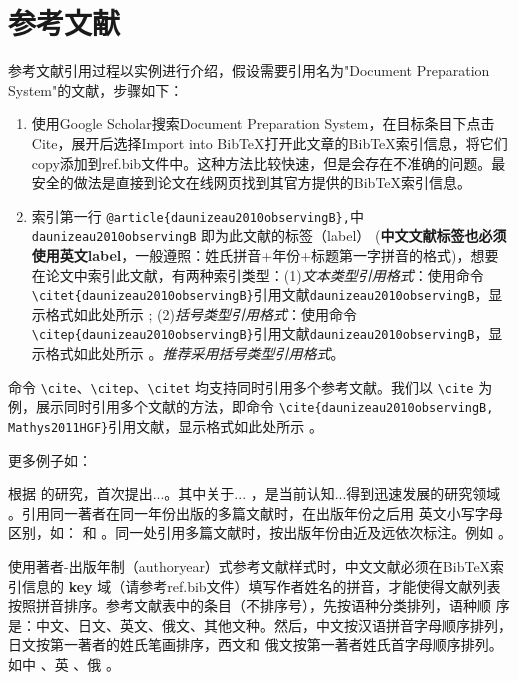 \chapter{参考文献}\label{cha：referenceformat}

参考文献引用过程以实例进行介绍，假设需要引用名为"Document Preparation System"的文献，步骤如下：
\begin{enumerate} \small
\item 使用Google Scholar搜索Document Preparation System，在目标条目下点击Cite，展开后选择Import into BibTeX打开此文章的BibTeX索引信息，将它们copy添加到ref.bib文件中。这种方法比较快速，但是会存在不准确的问题。最安全的做法是直接到论文在线网页找到其官方提供的BibTeX索引信息。

\item 索引第一行 \verb|@article{daunizeau2010observingB},|中 \verb|daunizeau2010observingB| 即为此文献的标签（label） (\textbf{中文文献标签也必须使用英文label}，一般遵照：姓氏拼音+年份+标题第一字拼音的格式)，想要在论文中索引此文献，有两种索引类型：(1)\emph{文本类型引用格式}：使用命令\verb|\citet{daunizeau2010observingB}|引用文献\verb|daunizeau2010observingB|，显示格式如此处所示 \citet{daunizeau2010observingB}; (2)\emph{括号类型引用格式}：使用命令\verb|\citep{daunizeau2010observingB}|引用文献\verb|daunizeau2010observingB|，显示格式如此处所示 \citep{daunizeau2010observingB}。\emph{推荐采用括号类型引用格式}。
\end{enumerate}


 命令 \verb|\cite|、\verb|\citep|、\verb|\citet| 均支持同时引用多个参考文献。我们以 \verb|\cite| 为例，展示同时引用多个文献的方法，即命令 \verb|\cite{daunizeau2010observingB, Mathys2011HGF}|引用文献，显示格式如此处所示 \cite{daunizeau2010observingB, Mathys2011HGF}。

更多例子如：

\citet{Mathys2011HGF} 根据 \citet{daunizeau2010observingA,daunizeau2010observingB} 的研究，首次提出...。其中关于... \citep{adolphs2003cognitive, YAU2023107799}，是当前认知...得到迅速发展的研究领域 \citep{NIPS2012_c399862d, goodfellow2016book}。引用同一著者在同一年份出版的多篇文献时，在出版年份之后用
英文小写字母区别，如：\citep{daunizeau2010observingA, daunizeau2010observingB} 和 \citet{daunizeau2010observingA, daunizeau2010observingB}。同一处引用多篇文献时，按出版年份由近及远依次标注。例如 \citep{beal2003VB,Friston_freeEnergy_2010, Mathys2011HGF, sutton2018reinforcement}。

使用著者-出版年制（authoryear）式参考文献样式时，中文文献必须在BibTeX索引信息的 \textbf{key} 域（请参考ref.bib文件）填写作者姓名的拼音，才能使得文献列表按照拼音排序。参考文献表中的条目（不排序号），先按语种分类排列，语种顺 序是：中文、日文、英文、俄文、其他文种。然后，中文按汉语拼音字母顺序排列，日文按第一著者的姓氏笔画排序，西文和 俄文按第一著者姓氏首字母顺序排列。如中 \citep{wei2021_bayesian,matThm_zhang2013}、英 \citep{AMARI1993185,mirza2018human}、俄 \citep{Dubrovin1906}。

